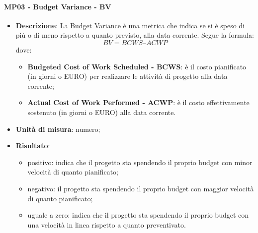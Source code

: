  		\paragraph{MP03 - Budget Variance - BV}
 		\begin{itemize}
 			\item \textbf{Descrizione}:
 			La Budget Variance è una metrica che indica se si è speso di più o di meno rispetto a quanto previsto, alla data corrente. Segue la formula:
 			\begin{displaymath}
 				BV = {BCWS – ACWP}
 			\end{displaymath}
 			dove:
 			\begin{itemize}
 				\item {\bfseries Budgeted Cost of Work Scheduled - BCWS}: è il costo pianificato (in giorni o EURO) per realizzare le attività di progetto alla data corrente;
 				\item {\bfseries Actual Cost of Work Performed - ACWP}: è il costo effettivamente sostenuto (in giorni o EURO) alla data corrente.
 			\end{itemize}
 			\item \textbf{Unità di misura}: numero;
 			\item \textbf{Risultato}:
            \begin{itemize}
     			\item positivo: indica che il progetto sta spendendo il proprio budget con minor velocità di quanto pianificato;
     			\item negativo: il progetto sta spendendo il proprio budget con maggior velocità di quanto pianificato;
     			\item uguale a zero: indica che il progetto sta spendendo il proprio budget con una velocità in linea rispetto a quanto preventivato.\\
            \end{itemize}
 		\end{itemize}

